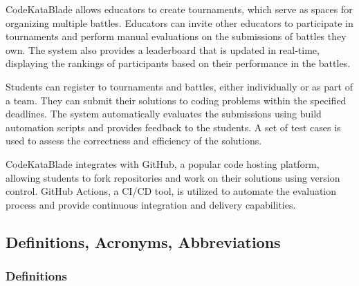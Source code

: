 \documentclass{article}
\begin{document}
CodeKataBlade allows educators to create tournaments, which serve as spaces for organizing multiple battles. Educators can invite other educators to participate in tournaments and perform manual evaluations on the submissions of battles they own. The system also provides a leaderboard that is updated in real-time, displaying the rankings of participants based on their performance in the battles.

Students can register to tournaments and battles, either individually or as part of a team. They can submit their solutions to coding problems within the specified deadlines. The system automatically evaluates the submissions using build automation scripts and provides feedback to the students. A set of test cases is used to assess the correctness and efficiency of the solutions.

CodeKataBlade integrates with GitHub, a popular code hosting platform, allowing students to fork repositories and work on their solutions using version control. GitHub Actions, a CI/CD tool, is utilized to automate the evaluation process and provide continuous integration and delivery capabilities.

\subsection{Definitions, Acronyms, Abbreviations}

\subsubsection{Definitions}
 
\end{document}
